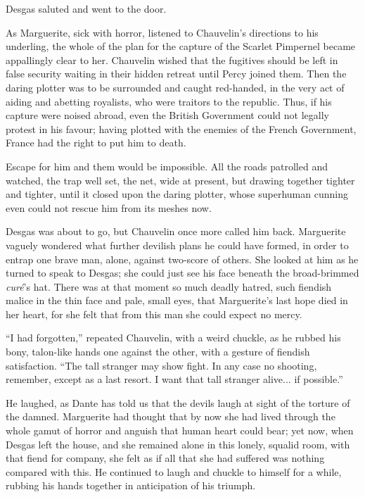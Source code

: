 Desgas saluted and went to the door.

As Marguerite, sick with horror, listened to Chauvelin's directions to his underling, the whole of the plan for the capture of the Scarlet Pimpernel became appallingly clear to her. Chauvelin wished that the fugitives should be left in false security waiting in their hidden retreat until Percy joined them. Then the daring plotter was to be surrounded and caught red-handed, in the very act of aiding and abetting royalists, who were traitors to the republic. Thus, if his capture were noised abroad, even the British Government could not legally protest in his favour; having plotted with the enemies of the French Government, France had the right to put him to death.

Escape for him and them would be impossible. All the roads patrolled and watched, the trap well set, the net, wide at present, but drawing together tighter and tighter, until it closed upon the daring plotter, whose superhuman cunning even could not rescue him from its meshes now.

Desgas was about to go, but Chauvelin once more called him back. Marguerite vaguely wondered what further devilish plans he could have formed, in order to entrap one brave man, alone, against two-score of others. She looked at him as he turned to speak to Desgas; she could just see his face beneath the broad-brimmed \textit{curé}'s hat. There was at that moment so much deadly hatred, such fiendish malice in the thin face and pale, small eyes, that Marguerite's last hope died in her heart, for she felt that from this man she could expect no mercy.

\enquote{I had forgotten,} repeated Chauvelin, with a weird chuckle, as he rubbed his bony, talon-like hands one against the other, with a gesture of fiendish satisfaction. \enquote{The tall stranger may show fight. In any case no shooting, remember, except as a last resort. I want that tall stranger alive... if possible.}

He laughed, as Dante has told us that the devils laugh at sight of the torture of the damned. Marguerite had thought that by now she had lived through the whole gamut of horror and anguish that human heart could bear; yet now, when Desgas left the house, and she remained alone in this lonely, squalid room, with that fiend for company, she felt as if all that she had suffered was nothing compared with this. He continued to laugh and chuckle to himself for a while, rubbing his hands together in anticipation of his triumph.

